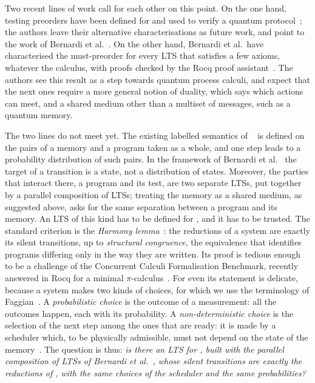Two recent lines of work call for each other on this point. On the one hand,
testing preorders have been defined for \lqCCS and used to verify a quantum
protocol~\cite{Ceragioli27}; the authors leave their alternative
characterisations as future work, and point to the work of Bernardi et
al.~\cite{BCLS25,BFL26}. On the other hand, Bernardi et al.\ have
characterised the must-preorder for every LTS that satisfies a few axioms,
whatever the calculus, with proofs checked by the Rocq proof
assistant~\cite{BFL26}. The authors see this result as a step towards
quantum process calculi, and expect that the next ones require a more general
notion of duality, which says which actions can meet, and a shared medium
other than a multiset of messages, such as a quantum memory.

The two lines do not meet yet. The existing labelled semantics of
\lqCCS{}~\cite{Ceragioli25,Ceragioli27} is defined on the pairs of a memory
and a program taken as a whole, and one step leads to a probability
distribution of such pairs. In the framework of Bernardi et al.~\cite{BFL26} the target of a transition is
a state, not a distribution of states. Moreover, the parties that interact
there, a program and its test, are two separate LTSs, put together by a
parallel composition of LTSs; treating the memory as a shared medium, as
suggested above, asks for the same separation between a program and its
memory. An LTS of this kind has to be defined for \lqCCS, and it has to be
trusted. The standard criterion is the \emph{Harmony
lemma}~\cite{Milner89,SangiorgiWalker01}: the reductions of a system are
exactly its silent transitions, up to \emph{structural congruence}, the
equivalence that identifies programs differing only in the way they are
written. Its proof is tedious enough to be a challenge of the Concurrent
Calculi Formalisation Benchmark, recently answered in Rocq for a minimal
$\pi$-calculus~\cite{KanLenglet26}. For \lqCCS even its statement is
delicate, because a system makes two kinds of choices, for which we use the
terminology of Faggian~\cite{Faggian22}. A \emph{probabilistic choice} is the outcome of a
measurement: all the outcomes happen, each with its probability. A
\emph{non-deterministic choice} is the selection of the next step among the
ones that are ready: it is made by a scheduler which, to be physically
admissible, must not depend on the state of the
memory~\cite{Ceragioli25}. The question is thus: \emph{is there an LTS for
\lqCCS, built with the parallel composition of LTSs of Bernardi et al.~\cite{BFL26}, whose
silent transitions are exactly the reductions of \lqCCS, with the same
choices of the scheduler and the same probabilities?}

